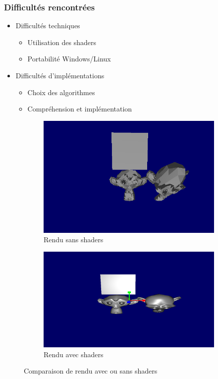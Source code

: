 \documentclass{beamer}
\begin{document}
\begin{frame}
\frametitle{Difficultés rencontrées}
\begin{itemize}[label=$\bullet$]
\item Difficultés techniques
\begin{itemize}[label=$\circ$]
\item Utilisation des shaders
\item Portabilité Windows/Linux
\end{itemize}
\item Difficultés d'implémentations
\begin{itemize}[label=$\circ$]
\item Choix des algorithmes
\item Compréhension et implémentation
\end{itemize}
\end{itemize}

\begin{figure}
\centering
\begin{subfigure}{.4\textwidth}
  \centering
  \includegraphics[width=1\linewidth]{rendu_sans_shader.png}
  \caption{Rendu sans shaders}
\end{subfigure}
\begin{subfigure}{.4\textwidth}
  \centering
  \includegraphics[width=1\linewidth]{singe_shaders.png}
  \caption{Rendu avec shaders}
\end{subfigure}
\caption{Comparaison de rendu avec ou sans shaders}
\end{figure}


\end{frame}
\end{document}
